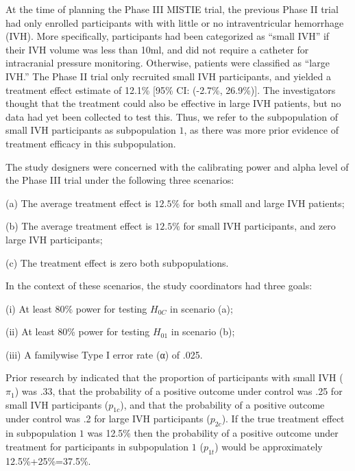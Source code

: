 \documentclass[article]{jss}
\begin{document}
At the time of planning the Phase III MISTIE trial, the previous Phase II trial had only enrolled participants with with little or no intraventricular hemorrhage (IVH). More specifically, participants had been categorized as ``small IVH'' if their IVH volume was less than 10ml, and did not require a catheter for intracranial pressure monitoring. Otherwise, patients were classified as ``large IVH.'' The Phase II trial only recruited small IVH participants, and yielded a treatment effect estimate of 12.1\% [95\% CI: (-2.7\%, 26.9\%)]. The investigators thought that the treatment could also be effective in large IVH patients, but no data had yet been collected to test this. Thus, we refer to the subpopulation of small IVH participants as subpopulation $1$, as there was more prior evidence of treatment efficacy in this subpopulation.

The study designers were concerned with the calibrating power and alpha level of the Phase III trial under the following three scenarios:


\begin{description}
\item  (a) The average treatment effect is $12.5\%$ for both small and large IVH patients;
\item  (b) The average treatment effect is $12.5\%$ for small IVH participants, and zero large IVH participants;
\item  (c) The treatment effect is zero both subpopulations. 
\end{description}

In the context of these scenarios, the study coordinators had three goals:

\begin{description}
\item  (i) At least 80\% power for testing $H_{0C}$ in scenario (a);
\item  (ii) At least 80\% power for testing $H_{01}$ in scenario (b);
\item  (iii) A familywise Type I error rate (α) of .025.
\end{description}

Prior research by \cite{Hanley2012} indicated that the proportion of participants with small IVH ($π_1$) was .33, that the probability of a positive outcome under control was .25 for small IVH participants ($p_{1c}$), and that the probability of a positive outcome under control was .2 for large IVH participants ($p_{2c}$).  If the true treatment effect in subpopulation $1$ was 12.5\% then the probability of a positive outcome under treatment for participants in subpopulation $1$ ($p_{1t}$) would be approximately 12.5\%+25\%=37.5\%.
\end{document}
